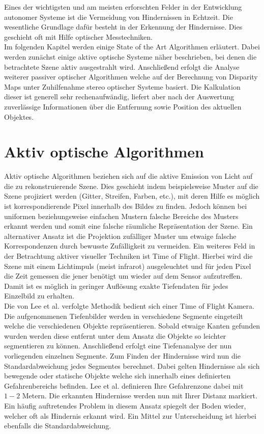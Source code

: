 Eines der wichtigsten und am meisten erforschten Felder in der Entwicklung autonomer Systeme ist die Vermeidung von Hindernissen in Echtzeit. Die wesentliche Grundlage dafür besteht in der Erkennung der Hindernisse. Dies geschieht oft mit Hilfe optischer Messtechniken.\\
\noindent
Im folgenden Kapitel werden einige State of the Art Algorithmen erläutert. Dabei werden zunächst einige aktive optische Systeme näher beschrieben, bei denen die betrachtete Szene aktiv ausgestrahlt wird. Anschließend erfolgt die Analyse weiterer passiver optischer Algorithmen welche auf der Berechnung von Disparity Maps unter Zuhilfenahme stereo optischer Systeme basiert. Die Kalkulation dieser ist generell sehr rechenaufwändig, liefert aber nach der Auswertung zuverlässige Informationen über die Entfernung sowie Position des aktuellen Objektes.


\section{Aktiv optische Algorithmen}
\label{sec:kamera_basierte_he}
Aktiv optische Algorithmen beziehen sich auf die aktive Emission von Licht auf die zu rekonstruierende Szene. Dies geschieht indem beispielsweise Muster auf die Szene projiziert werden (Gitter, Streifen, Farben, etc.), mit deren Hilfe es möglich ist korrespondierende Pixel innerhalb des Bildes zu finden. Jedoch können bei uniformen beziehungsweise einfachen Mustern falsche Bereiche des Musters erkannt werden und somit eine falsche räumliche Repräsentation der Szene. Ein alternativer Ansatz ist die Projektion zufälliger Muster um etwaige falsche Korrespondenzen durch bewusste Zufälligkeit zu vermeiden. Ein weiteres Feld in der Betrachtung aktiver visueller Techniken ist Time of Flight. Hierbei wird die Szene mit einem Lichtimpuls (meist infrarot) ausgeleuchtet und für jeden Pixel die Zeit gemessen die jener benötigt um wieder auf dem Sensor aufzutreffen. Damit ist es möglich in geringer Auflösung exakte Tiefendaten für jedes Einzelbild zu erhalten.\\

\noindent
Die von Lee et al. \cite{lee2012intelligent} verfolgte Methodik bedient sich einer Time of Flight Kamera. Die aufgenommenen Tiefenbilder werden in verschiedene Segmente eingeteilt welche die verschiedenen Objekte repräsentieren. Sobald etwaige Kanten gefunden wurden werden diese entfernt unter dem Ansatz die Objekte so leichter segmentieren zu können. Anschließend erfolgt eine Tiefenanalyse der nun vorliegenden einzelnen Segmente. Zum Finden der Hindernisse wird nun die Standardabweichung jedes Segmentes berechnet.
Dabei gelten Hindernisse als sich bewegende oder statische Objekte welche sich innerhalb eines definierten Gefahrenbereichs befinden. Lee et al. definieren Ihre Gefahrenzone dabei mit $1-2$ Metern. Die erkannten Hindernisse werden nun mit Ihrer Distanz markiert. Ein häufig auftretendes Problem in diesem Ansatz spiegelt der Boden wieder, welcher oft als Hindernis erkannt wird. Ein Mittel zur Unterscheidung ist hierbei ebenfalls die Standardabweichung.\\

